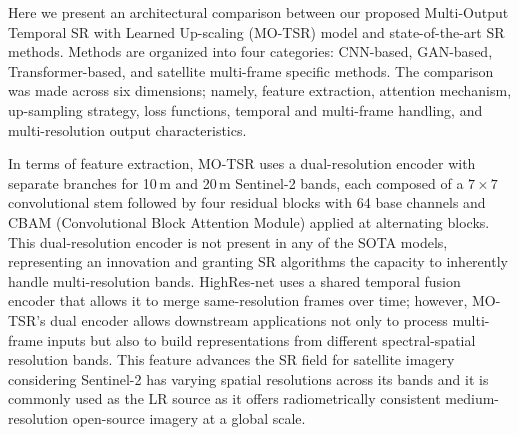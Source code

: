        Here we present an architectural comparison between our proposed Multi-Output Temporal SR with Learned Up-scaling (MO-TSR) model and state-of-the-art SR methods. Methods are organized into four categories: CNN-based, GAN-based, Transformer-based, and satellite multi-frame specific methods. The comparison was made across six dimensions; namely, feature extraction, attention mechanism, up-sampling strategy, loss functions, temporal and multi-frame handling, and multi-resolution output characteristics.

        In terms of feature extraction, MO-TSR uses a dual-resolution encoder with separate branches for 10\,m and 20\,m Sentinel-2 bands, each composed of a $7 \times 7$ convolutional stem followed by four residual blocks with 64 base channels and CBAM (Convolutional Block Attention Module) applied at alternating blocks. This dual-resolution encoder is not present in any of the SOTA models, representing an innovation and granting SR algorithms the capacity to inherently handle multi-resolution bands. HighRes-net \citep{deudon2020highresnetrecursivefusionmultiframe} uses a shared temporal fusion encoder that allows it to merge same-resolution frames over time; however, MO-TSR's dual encoder allows downstream applications not only to process multi-frame inputs but also to build representations from different spectral-spatial resolution bands. This feature advances the SR field for satellite imagery considering Sentinel-2 has varying spatial resolutions across its bands and it is commonly used as the LR source as it offers radiometrically consistent medium-resolution open-source imagery at a global scale. 
        
